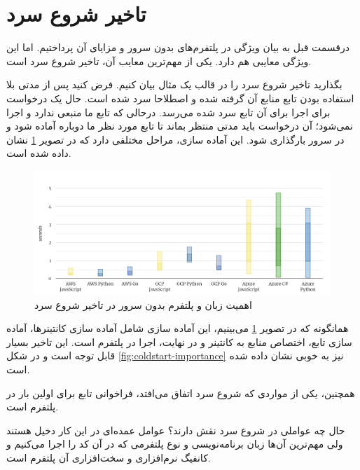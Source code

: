 \section{تاخیر شروع سرد}

درقسمت قبل به بیان ویژگی  در پلتفرم‌های بدون سرور و مزایای آن پرداختیم. اما این ویژگی معایبی هم دارد. یکی از مهم‌ترین معایب آن، تاخیر شروع سرد است. 

بگذارید تاخیر شروع سرد را در قالب یک مثال بیان کنیم. فرض کنید پس از مدتی بلا استفاده بودن تابع منابع آن گرفته شده و اصطلاحا سرد شده است. حال یک درخواست برای اجرا برای آن تابع سرد شده می‌رسد. درحالی که تابع ما منبعی ندارد و اجرا نمی‌شود؛ آن درخواست  باید مدتی منتظر بماند تا تابع مورد نظر ما دوباره آماده شود و در سرور بارگذاری شود. این آماده سازی، مراحل مختلفی دارد که در تصویر \ref{fig:ColdStart-programming-languages} نشان داده شده است. 

\begin{figure}
	\centering
	\includegraphics[width=\linewidth]{figs/ColdStart-programming-languages}
	\caption {اهمیت زبان و پلتفرم بدون سرور در تاخیر شروع سرد}
	\label{fig:ColdStart-programming-languages}
\end{figure}

\par
همانگونه که در تصویر \ref{fig:ColdStart-programming-languages} می‌بینیم، این آماده سازی شامل آماده سازی کانتینر‌ها، آماده سازی تابع، اختصاص منابع به کانتینر و در نهایت، اجرا در پلتفرم است. این تاخیر بسیار قابل توجه است و در شکل \ref{fig:coldstart-importance} نیز به خوبی نشان داده شده است. 

\par
همچنین،‌ یکی از مواردی که شروع سرد اتفاق می‌افتد، فراخوانی تابع برای اولین بار در پلتفرم است. 

حال چه عواملی در شروع سرد نقش دارند؟ عوامل عمده‌ای در این کار دخیل هستند ولی مهم‌ترین آن‌ها زبان برنامه‌نویسی و نوع پلتفرمی که در آن کد را اجرا می‌کنیم و کانفیگ نرم‌افزاری و سخت‌افزاری آن پلتفرم است. 

